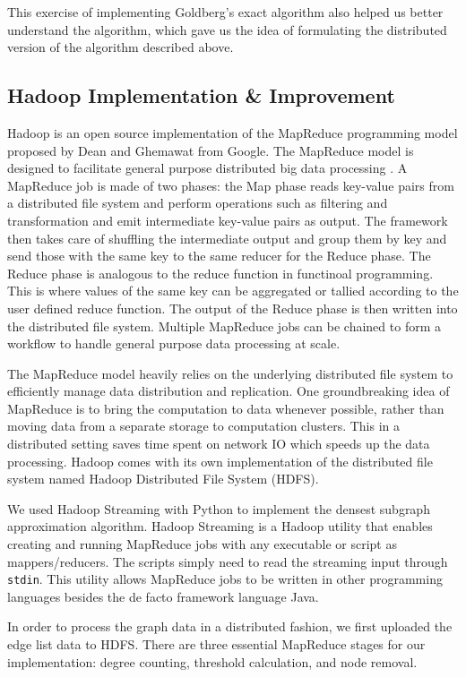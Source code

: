 \documentclass{article}
\begin{document}
This exercise of implementing Goldberg's exact algorithm also helped us better understand the algorithm, which gave us the idea of formulating the distributed version of the algorithm described above.

\subsection{Hadoop Implementation \& Improvement}
Hadoop is an open source implementation of the MapReduce programming model proposed by Dean and Ghemawat from Google. The MapReduce model is designed to facilitate general purpose distributed big data processing \cite{Dean:2004:MSD:1251254.1251264}. A MapReduce job is made of two phases: the Map phase reads key-value pairs from a distributed file system and perform operations such as filtering and transformation and emit intermediate key-value pairs as output. The framework then takes care of shuffling the intermediate output and group them by key and send those with the same key to the same reducer for the Reduce phase. The Reduce phase is analogous to the reduce function in functinoal programming. This is where values of the same key can be aggregated or tallied according to the user defined reduce function. The output of the Reduce phase is then written into the distributed file system. Multiple MapReduce jobs can be chained to form a workflow to handle general purpose data processing at scale.

The MapReduce model heavily relies on the underlying distributed file system to efficiently manage data distribution and replication. One groundbreaking idea of MapReduce is to bring the computation to data whenever possible, rather than moving data from a separate storage to computation clusters. This in a distributed setting saves time spent on network IO which speeds up the data processing. Hadoop comes with its own implementation of the distributed file system named Hadoop Distributed File System (HDFS).

We used Hadoop Streaming with Python to implement the densest subgraph approximation algorithm. Hadoop Streaming is a Hadoop utility that enables creating and running MapReduce jobs with any executable or script as mappers/reducers. The scripts simply need to read the streaming input through \texttt{stdin}. This utility allows MapReduce jobs to be written in other programming languages besides the de facto framework language Java.

In order to process the graph data in a distributed fashion, we first uploaded the edge list data to HDFS. There are three essential MapReduce stages for our implementation: degree counting, threshold calculation, and node removal.
\end{document}
